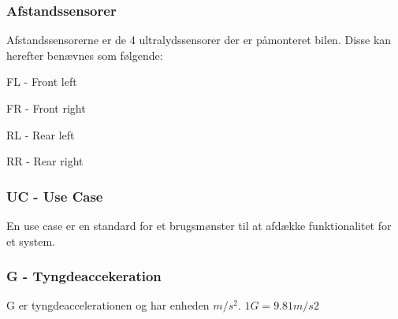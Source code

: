\subsubsection{Afstandssensorer}
Afstandssensorerne er de 4 ultralydssensorer der er påmonteret bilen. Disse kan herefter benævnes som følgende:
\begin{packed_item}
	\item FL - Front left
	\item FR - Front right
	\item RL - Rear left
	\item RR - Rear right
\end{packed_item}

\subsubsection{UC - Use Case}
En use case er en standard for et brugsmønster til at afdække funktionalitet for et system.

\subsubsection{G - Tyngdeaccekeration}
G er tyngdeaccelerationen og har enheden $m/s^2$. $1G=9.81 m/s2$

